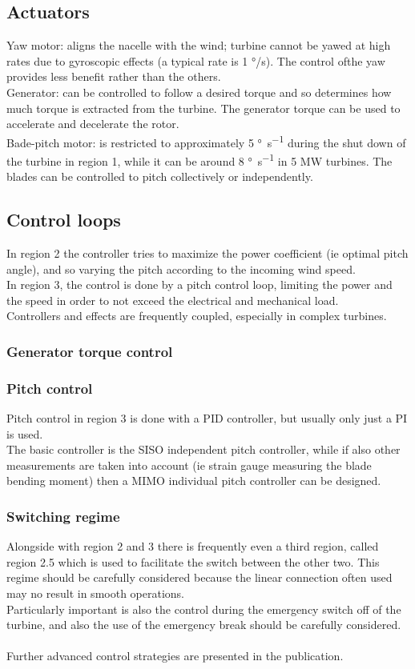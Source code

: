\documentclass[]{article}
\begin{document}
\subsection{Actuators} 
Yaw motor: aligns the nacelle with the wind; turbine cannot be yawed at high rates due to gyroscopic effects (a typical rate is 1 \si{\degree}/s). The control ofthe yaw provides less benefit rather than the others.\\
Generator: can be controlled to follow a desired torque and so determines how much torque is extracted from the turbine. The generator torque can be used to accelerate and decelerate the rotor. \\
Bade-pitch motor: is restricted to approximately 5 \si{\degree \per \second} during the shut down of the turbine in region 1, while it can be around 8 \si{\degree \per \second} in 5 MW turbines. The blades can be controlled to pitch collectively or independently. 
\subsection{Control loops}
In region 2 the controller tries to maximize the power coefficient (ie optimal pitch angle), and so varying the pitch according to the incoming wind speed. \\
In region 3, the control is done by a pitch control loop, limiting the power and the speed in order to not exceed the electrical and mechanical load. \\
Controllers and effects are frequently coupled, especially in complex turbines. 
\subsubsection{Generator torque control}
\subsubsection{Pitch control}
Pitch control in region 3 is done with a PID controller, but usually only just a PI is used. \\
The basic controller is the SISO independent pitch controller, while if also other measurements are taken into account (ie strain gauge measuring the blade bending moment) then a MIMO individual pitch controller can be designed. 
\subsubsection{Switching regime}
Alongside with region 2 and 3 there is frequently even a third region, called region 2.5 which is used to facilitate the switch between the other two. This regime should be carefully considered because the linear connection often used may no result in smooth operations. \\
Particularly important is also the control during the emergency switch off of the turbine, and also the use of the emergency break should be carefully considered. \\ \\
Further advanced control strategies are presented in the publication.
\end{document}
